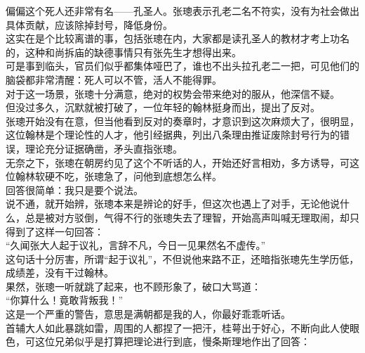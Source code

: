 \begin{multicols}{\theparacolNo}
偏偏这个死人还非常有名——孔圣人。张璁表示孔老二名不符实，没有为社会做出具体贡献，应该除掉封号，降低身份。\\

这实在是个比较离谱的事，包括张璁在内，大家都是读孔圣人的教材才考上功名的，这种和尚拆庙的缺德事情只有张先生才想得出来。\\

可是事到临头，官员们似乎都集体哑巴了，谁也不出头拉孔老二一把，可见他们的脑袋都非常清醒：死人可以不管，活人不能得罪。\\

对于这一场景，张璁十分满意，绝对的权势会带来绝对的服从，他深信不疑。\\

但没过多久，沉默就被打破了，一位年轻的翰林挺身而出，提出了反对。\\

张璁开始没有在意，但当他看到反对的奏章时，才意识到这次麻烦大了，很明显，这位翰林是个理论性的人才，他引经据典，列出八条理由推证废除封号行为的错误，理论充分证据确凿，矛头直指张璁。\\

无奈之下，张璁在朝房约见了这个不听话的人，开始还好言相劝，多方诱导，可这位翰林软硬不吃，张璁急了，问他到底想怎么样。\\

回答很简单：我只是要个说法。\\

说不通，就开始辨，张璁本来是辨论的好手，但这次也遇上了对手，无论他说什么，总是被对方驳倒，气得不行的张璁失去了理智，开始高声叫喊无理取闹，却只得到了这样一句回答：\\

“久闻张大人起于议礼，言辞不凡，今日一见果然名不虚传。”\\

这句话十分厉害，所谓“起于议礼”，不但说他来路不正，还暗指张璁先生学历低，成绩差，没有干过翰林。\\

果然，张璁一听就跳了起来，也不顾形象了，破口大骂道：\\

“你算什么！竟敢背叛我！”\\

这是一个严重的警告，意思是满朝都是我的人，你最好乖乖听话。\\

首辅大人如此暴跳如雷，周围的人都捏了一把汗，桂萼出于好心，不断向此人使眼色，可这位兄弟似乎是打算把理论进行到底，慢条斯理地作出了回答：\\


\end{multicols}
